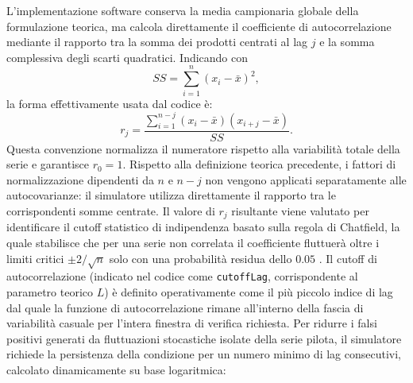 ﻿\documentclass[a4paper,12pt]{article}
\begin{document}
L'implementazione software conserva la media campionaria globale della formulazione teorica, ma calcola direttamente il coefficiente di autocorrelazione mediante il rapporto tra la somma dei prodotti centrati al lag $j$ e la somma complessiva degli scarti quadratici. Indicando con
\begin{equation}
    SS = \sum_{i=1}^{n}(x_i-\bar{x})^2,
\end{equation}
la forma effettivamente usata dal codice è:
\begin{equation}
    r_j =
    \frac{\displaystyle\sum_{i=1}^{n-j}(x_i-\bar{x})(x_{i+j}-\bar{x})}
         {\displaystyle SS}.
\end{equation}
Questa convenzione normalizza il numeratore rispetto alla variabilità totale della serie e garantisce $r_0=1$. Rispetto alla definizione teorica precedente, i fattori di normalizzazione dipendenti da $n$ e $n-j$ non vengono applicati separatamente alle autocovarianze: il simulatore utilizza direttamente il rapporto tra le corrispondenti somme centrate.
Il valore di $r_j$ risultante viene valutato per identificare il cutoff statistico di indipendenza basato sulla regola di Chatfield, la quale stabilisce che per una serie non correlata il coefficiente fluttuerà oltre i limiti critici $\pm 2/\sqrt{n}$ solo con una probabilità residua dello $0.05$ \cite{leemis-park-book}.
Il cutoff di autocorrelazione (indicato nel codice come \texttt{cutoffLag}, corrispondente al parametro teorico $L$) è definito operativamente come il più piccolo indice di lag dal quale la funzione di autocorrelazione rimane all'interno della fascia di variabilità casuale per l'intera finestra di verifica richiesta. Per ridurre i falsi positivi generati da fluttuazioni stocastiche isolate della serie pilota, il simulatore richiede la persistenza della condizione per un numero minimo di lag consecutivi, calcolato dinamicamente su base logaritmica:
\end{document}
